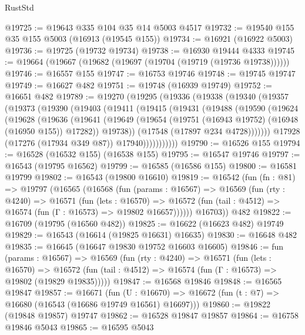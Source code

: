 \begin{lexlean}{RustStd}
\begin{coremodule}
@19725 := @19643 @335 @104 @35 @14 @5003 @4517
@19732 := @19540 @155 @35 @155 @5003 (@16913 (@19545 @155))
@19734 := @16921 (@16922 @5003)
@19736 := @19725 (@19732 @19734)
@19738 := @16930 @19444 @4333
@19745 := @19664 (@19667 (@19682 (@19697 (@19704 (@19719 (@19736 @19738))))))
@19746 := @16557 @155
@19747 := @16753 @19746
@19748 := @19745 @19747
@19749 := @16627 @482
@19751 := @19748 (@16939 @19749)
@19752 := @16651 @482
@19789 := @19270
    (@19295
      (@19336
        (@19338
          (@19340
            (@19357
              (@19373
                (@19390
                  (@19403
                    (@19411
                      (@19415
                        (@19431
                          (@19488
                            (@19590
                              (@19624
                                (@19628
                                  (@19636
                                    (@19641
                                      (@19649
                                        (@19654
                                          (@19751 (@16943 @19752) (@16948 (@16950 @155)) @17282))
                                        @19738))
                                    (@17548 (@17897 @234 @4728)))))))
                          @17928
                          (@17276 (@17934 @349 @87))
                          @17940)))))))))))
@19790 := @16526 @155
@19794 := @16528 (@16532 @155) (@16538 @155)
@19795 := @16547 @19746
@19797 := @16543 (@19795 @16562)
@19799 := @16585 (@16586 @155)
@19800 := @16581 @19799
@19802 := @16543 (@19800 @16610)
@19819 := @16542
    (fun (fn : @81) =>
    @19797
      (@16565
        (@16568
          (fun (params : @16567) =>
          @16569
            (fun (rty : @4240) =>
            @16571
              (fun (lets : @16570) =>
              @16572 (fun (tail : @4512) => @16574 (fun (Γ : @16573) => @19802 @16657))))))
        @16703))
    @482
@19822 := @16709 (@19795 (@16560 @482))
@19825 := @16622 (@16623 @482) @19749
@19829 := @16543 (@16614 (@19825 @16631) @16635)
@19830 := @16648 @482
@19835 := @16645 (@16647 @19830 @19752 @16603 @16605)
@19846 := fun (params : @16567) =>
  @16569
    (fun (rty : @4240) =>
    @16571
      (fun (lets : @16570) =>
      @16572 (fun (tail : @4512) => @16574 (fun (Γ : @16573) => @19802 (@19829 @19835)))))
@19847 := @16568 @19846
@19848 := @16565 @19847
@19857 := @16671
    (fun (U : @16670) => @16672 (fun (t : @7) => @16680 (@16543 (@16686 @19749 @16561) @16697)))
@19860 := @19822 (@19848 @19857) @19747
@19862 := @16528 @19847 @19857
@19864 := @16758 @19846 @5043
@19865 := @16595 @5043

\end{coremodule}
\end{lexlean}
